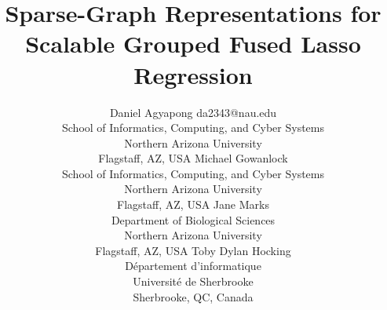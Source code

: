 \documentclass[twoside,11pt]{article}
\begin{document}
\title{Sparse-Graph Representations for Scalable Grouped Fused Lasso Regression}

\author{\name Daniel Agyapong \email da2343@nau.edu \\
       \addr School of Informatics, Computing, and Cyber Systems\\
       Northern Arizona University\\
       Flagstaff, AZ, USA
       \AND
       \name Michael Gowanlock \\
       \addr School of Informatics, Computing, and Cyber Systems\\
       Northern Arizona University\\
       Flagstaff, AZ, USA
       \AND
       \name Jane Marks \\
       \addr Department of Biological Sciences\\
       Northern Arizona University\\
       Flagstaff, AZ, USA
       \AND
       \name Toby Dylan Hocking \\
       \addr D\'epartement d'informatique\\
       Universit\'e de Sherbrooke\\
       Sherbrooke, QC, Canada}


\maketitle
\end{document}

